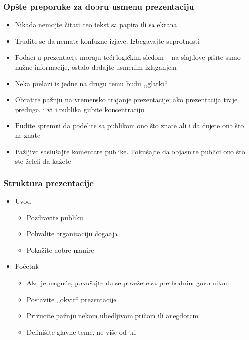 \documentclass{beamer}
\begin{document}
\begin{frame}[fragile]\frametitle{Opšte preporuke za dobru usmenu prezentaciju}
	\begin{itemize}		
		\item Nikada nemojte čitati ceo tekst sa papira ili sa ekrana
		\item Trudite se da nemate konfuzne izjave. Izbegavajte suprotnosti
				\item Podaci u prezentaciji moraju teći logičkim sledom
		-- na slajdove pišite samo nužne informacije, ostalo dodajte usmenim izlaganjem
     	\item Neka prelazi iz jedne na drugu temu budu ,,glatki``		
		\item Obratite pažnju na vremensko trajanje prezentacije; ako prezentacija traje predugo, i vi i publika gubite koncentraciju
		\item Budite spremni da podelite sa publikom ono što znate ali
		i da čujete ono što ne znate
		\item Pažljivo saslušajte komentare publike. Pokušajte
		da objasnite publici ono što ste želeli da kažete		
	\end{itemize}
\end{frame}

\begin{frame}[fragile]\frametitle{Struktura prezentacije}
	\begin{itemize}	
		\item  Uvod
		\begin{itemize}
			\item Pozdravite publiku
			\item Pohvalite organizaciju doga\d{}aja
			\item Pokažite dobre manire
		\end{itemize}
		\item Početak
		\begin{itemize}
			\item Ako je moguće, pokušajte da se povežete sa prethodnim govornikom
			\item Postavite ,,okvir`` prezentacije
			\item Privucite pažnju nekom ubedljivom pričom ili
			anegdotom
			\item Definišite glavne teme, ne više od tri
		\end{itemize}		
	\end{itemize}
\end{frame}
\end{document}
